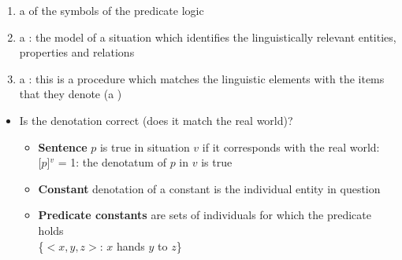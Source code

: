\documentclass[headrule,footrule]{foils}
\begin{document}
\begin{enumerate}\addtolength{\itemsep}{-1.5ex}
\item a  of the symbols of the predicate logic
\item a : the model of a situation which identifies the
  linguistically relevant entities, properties and relations
\item a : this is a procedure
  which matches the linguistic elements with the items  that they denote (a )
\end{enumerate}
\begin{itemize}
\item Is the denotation correct (does it match the real world)?
  \begin{itemize}
  \item \textbf{Sentence} 
    $p$ is true in situation $v$ if it corresponds with the real world: 
    \\ {[$p$]$^v$ = 1}: the denotatum of $p$ in $v$ is true
  \item \textbf{Constant} denotation of a constant is the individual entity in question
  \item \textbf{Predicate constants} are sets of individuals for which the predicate holds
\\ {\{$<x, y, z>$: $x$ hands $y$ to $z$\}}
  \end{itemize}

\end{itemize}


\end{document}
